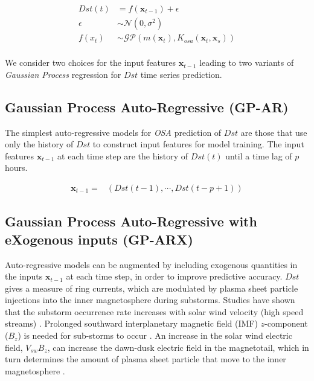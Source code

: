 \documentclass{article}
\begin{document}
\begin{align}
  Dst(t) & =  f(\mathbf{x}_{t-1}) + \epsilon \label{eq:Dst} \\
  \epsilon & \sim  \mathcal{N}(0, \sigma^2) \label{eq:GPNoise} \\
  f(x_t) & \sim  \mathcal{GP}(m(\mathbf{x}_t), K_{osa}(\mathbf{x}_t, \mathbf{x}_s)) \label{eq:DstGP} \\
\end{align}

We consider two choices for the input features $\mathbf{x}_{t-1}$
leading to two variants of \emph{Gaussian Process} regression for
$Dst$ time series prediction.

\subsection{Gaussian Process Auto-Regressive (GP-AR)} \label{sec:gpar}

The simplest auto-regressive models for \emph{OSA} prediction of $Dst$
are those that use only the history of $Dst$ to construct input
features for model training. The input features $\mathbf{x}_{t-1}$ at
each time step are the history of $Dst(t)$ until a time lag of $p$ hours.

\begin{align*}
  \mathbf{x}_{t-1} = & \left(Dst(t-1), \cdots , Dst(t-p+1)\right)
\end{align*}

\subsection{Gaussian Process Auto-Regressive with eXogenous inputs (GP-ARX)} \label{sec:gparx}

Auto-regressive models can be augmented by including exogenous
quantities in the inputs $\mathbf{x}_{t-1}$ at each time step, in
order to improve predictive accuracy. $Dst$ gives a measure of ring
currents, which are modulated by plasma sheet particle injections into
the inner magnetosphere during substorms. Studies have shown that the
substorm occurrence rate increases with solar wind velocity (high
speed streams) \citet{Kissinger2011,Newell2016}. Prolonged southward
interplanetary magnetic field (IMF) $z$-component ($B_z$) is needed
for sub-storms to occur \citet{McPherron1986}. An increase in the
solar wind electric field, $V_{sw}B_z$, can increase the dawn-dusk
electric field in the magnetotail, which in turn determines the amount
of plasma sheet particle that move to the inner magnetosphere
\citet{Friedel2001}.
\end{document}

